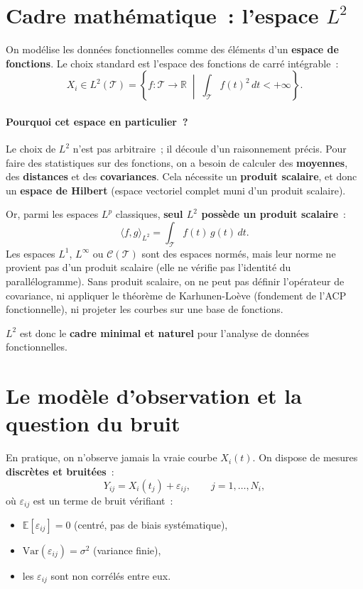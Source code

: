 \documentclass[11pt, a4paper]{article}
\newcommand{\R}{\mathbb{R}}
\newcommand{\E}{\mathbb{E}}
\newcommand{\Var}{\mathrm{Var}}
\newcommand{\Ltwo}{L^2(\mathcal{T})}
\begin{document}
\section{Cadre math\'ematique~: l'espace $L^2$}

On mod\'elise les donn\'ees fonctionnelles comme des \'el\'ements d'un \textbf{espace de fonctions}. Le choix standard est l'espace des fonctions de carr\'e int\'egrable~:
\[
    X_i \in \Ltwo = \left\{ f : \mathcal{T} \to \R \;\middle|\; \int_{\mathcal{T}} f(t)^2 \, dt < +\infty \right\}.
\]

\paragraph{Pourquoi cet espace en particulier~?}
Le choix de $L^2$ n'est pas arbitraire~; il d\'ecoule d'un raisonnement pr\'ecis. Pour faire des statistiques sur des fonctions, on a besoin de calculer des \textbf{moyennes}, des \textbf{distances} et des \textbf{covariances}. Cela n\'ecessite un \textbf{produit scalaire}, et donc un \textbf{espace de Hilbert} (espace vectoriel complet muni d'un produit scalaire).

Or, parmi les espaces $L^p$ classiques, \textbf{seul $L^2$ poss\`ede un produit scalaire}~:
\[
    \langle f, g \rangle_{L^2} = \int_{\mathcal{T}} f(t) \, g(t) \, dt.
\]
Les espaces $L^1$, $L^\infty$ ou $\mathcal{C}(\mathcal{T})$ sont des espaces norm\'es, mais leur norme ne provient pas d'un produit scalaire (elle ne v\'erifie pas l'identit\'e du parall\'elogramme). Sans produit scalaire, on ne peut pas d\'efinir l'op\'erateur de covariance, ni appliquer le th\'eor\`eme de Karhunen-Lo\`eve (fondement de l'ACP fonctionnelle), ni projeter les courbes sur une base de fonctions.

$L^2$ est donc le \textbf{cadre minimal et naturel} pour l'analyse de donn\'ees fonctionnelles.

\section{Le mod\`ele d'observation et la question du bruit}

En pratique, on n'observe jamais la vraie courbe $X_i(t)$. On dispose de mesures \textbf{discr\`etes et bruit\'ees}~:
\[
    Y_{ij} = X_i(t_j) + \varepsilon_{ij}, \qquad j = 1, \ldots, N_i,
\]
o\`u $\varepsilon_{ij}$ est un terme de bruit v\'erifiant~:
\begin{itemize}[nosep]
    \item $\E[\varepsilon_{ij}] = 0$ (centr\'e, pas de biais syst\'ematique),
    \item $\Var(\varepsilon_{ij}) = \sigma^2$ (variance finie),
    \item les $\varepsilon_{ij}$ sont non corr\'el\'es entre eux.
\end{itemize}
\end{document}
